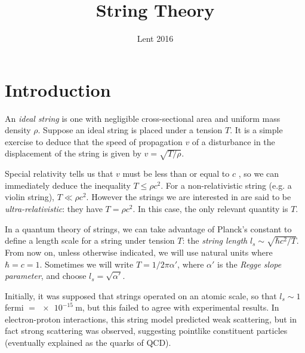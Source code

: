 \documentclass{jknotes}
\begin{document}
\title{String Theory}
\date{Lent 2016}

\maketitle
\suggestionsspiel
\tableofcontents

\section{Introduction}
An \emph{ideal string} is one with negligible cross-sectional area and uniform mass density \(\rho\). Suppose an ideal string is placed under a tension \(T\). It is a simple exercise to deduce that the speed of propagation \(v\) of a disturbance in the displacement of the string is given by \(v = \sqrt{T/\rho}\).
\begin{figure}[H]
    \centering
\end{figure}
Special relativity tells us that \(v\) must be less than or equal to \(c\) \disapprove, so we can immediately deduce the inequality \(T \le \rho c^2\). For a non-relativistic string (e.g. a violin string), \(T \ll \rho c^2\). However the strings we are interested in are said to be \emph{ultra-relativistic}: they have \(T=\rho c^2\). In this case, the only relevant quantity is \(T\).

In a quantum theory of strings, we can take advantage of Planck's constant to define a length scale for a string under tension \(T\): the \emph{string length} \(l_s \sim \sqrt{\hbar c^2/T}\). From now on, unless otherwise indicated, we will use natural units where \(\hbar=c=1\). Sometimes we will write \(T=1/2\pi\alpha'\), where \(\alpha'\) is the \emph{Regge slope parameter}, and choose \(l_s = \sqrt{\alpha'}\).

Initially, it was supposed that strings operated on an atomic scale, so that \(l_s \sim 1\) fermi \(= \SI{e-15}{\meter}\), but this failed to agree with experimental results. In electron-proton interactions, this string model predicted weak scattering, but in fact strong scattering was observed, suggesting pointlike constituent particles (eventually explained as the quarks of QCD).
\end{document}
